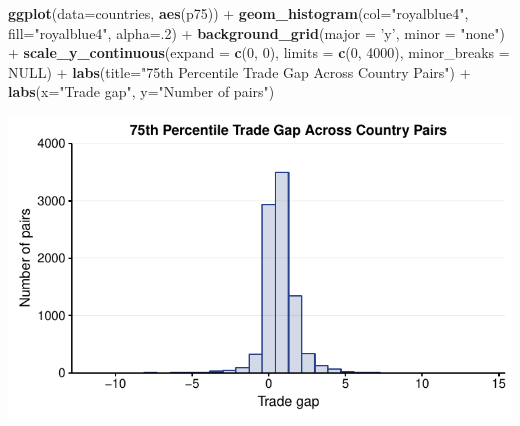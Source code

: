 \documentclass[10pt,]{article}
\newenvironment{Shaded}{\begin{snugshade}}{\end{snugshade}}
\newcommand{\KeywordTok}[1]{\textcolor[rgb]{0.13,0.29,0.53}{\textbf{{#1}}}}
\newcommand{\DataTypeTok}[1]{\textcolor[rgb]{0.13,0.29,0.53}{{#1}}}
\newcommand{\DecValTok}[1]{\textcolor[rgb]{0.00,0.00,0.81}{{#1}}}
\newcommand{\StringTok}[1]{\textcolor[rgb]{0.31,0.60,0.02}{{#1}}}
\newcommand{\OtherTok}[1]{\textcolor[rgb]{0.56,0.35,0.01}{{#1}}}
\newcommand{\NormalTok}[1]{{#1}}
\begin{document}
\begin{Shaded}
\begin{Highlighting}[]
\KeywordTok{ggplot}\NormalTok{(}\DataTypeTok{data=}\NormalTok{countries, }\KeywordTok{aes}\NormalTok{(p75)) +}
\StringTok{  }\KeywordTok{geom_histogram}\NormalTok{(}\DataTypeTok{col=}\StringTok{"royalblue4"}\NormalTok{,}
                 \DataTypeTok{fill=}\StringTok{"royalblue4"}\NormalTok{,}
                 \DataTypeTok{alpha=}\NormalTok{.}\DecValTok{2}\NormalTok{) +}
\StringTok{  }\KeywordTok{background_grid}\NormalTok{(}\DataTypeTok{major =} \StringTok{'y'}\NormalTok{, }\DataTypeTok{minor =} \StringTok{"none"}\NormalTok{) +}
\StringTok{  }\KeywordTok{scale_y_continuous}\NormalTok{(}\DataTypeTok{expand =} \KeywordTok{c}\NormalTok{(}\DecValTok{0}\NormalTok{, }\DecValTok{0}\NormalTok{), }\DataTypeTok{limits =} \KeywordTok{c}\NormalTok{(}\DecValTok{0}\NormalTok{, }\DecValTok{4000}\NormalTok{),  }\DataTypeTok{minor_breaks =} \OtherTok{NULL}\NormalTok{) +}
\StringTok{  }\KeywordTok{labs}\NormalTok{(}\DataTypeTok{title=}\StringTok{"75th Percentile Trade Gap Across Country Pairs"}\NormalTok{) +}
\StringTok{  }\KeywordTok{labs}\NormalTok{(}\DataTypeTok{x=}\StringTok{"Trade gap"}\NormalTok{, }\DataTypeTok{y=}\StringTok{"Number of pairs"}\NormalTok{)}
\end{Highlighting}
\end{Shaded}

\begin{center}\includegraphics{Figs/value_summary-9} \end{center}
\end{document}
